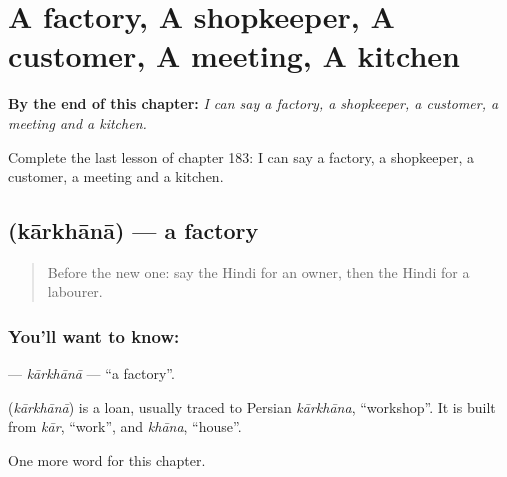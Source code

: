 
\chapter{A factory, A shopkeeper, A customer, A meeting, A kitchen}
\label{ch:hi-a-factory-a-shopkeeper-a-customer-a-meeting-a-kitchen}

\begin{chapteropening}
\textbf{By the end of this chapter:} \emph{I can say a factory, a shopkeeper, a customer, a meeting and a kitchen.}

Complete the last lesson of chapter 183: I can say a factory, a shopkeeper, a customer, a meeting and a kitchen.
\end{chapteropening}

\section[\texorpdfstring{\hi{कारख़ाना} (kārkhānā)}{कारख़ाना (kārkhānā)}]{ (kārkhānā) — a factory}

\label{lesson:HI-C183-karkhana}



\begin{quote}
Before the new one: say the Hindi for an owner, then the Hindi for a labourer.
\end{quote}

\subsection*{You'll want to know: }
\textbf{} — \emph{kārkhānā} — \textquotedblleft{}a factory\textquotedblright{}.

\begin{cousinweb}
\textbf{} (\emph{kārkhānā}) is a loan, usually traced to Persian \emph{kārkhāna}, \textquotedblleft{}workshop\textquotedblright{}. It is built from \emph{kār}, \textquotedblleft{}work\textquotedblright{}, and \emph{khāna}, \textquotedblleft{}house\textquotedblright{}.
\end{cousinweb}

\begin{grammarlens}[title={What you've built}]
One more word for this chapter.
\end{grammarlens}

